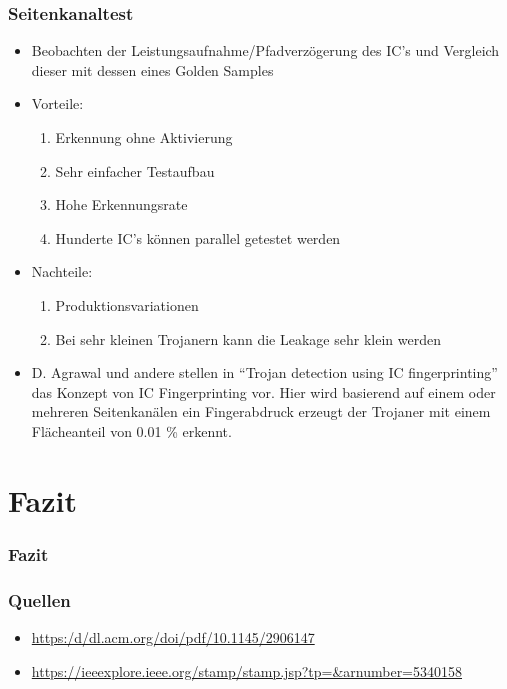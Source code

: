 \documentclass[11pt]{beamer}
\begin{document}
\begin{frame}
    \frametitle{Seitenkanaltest}
    \begin{itemize}
        \item Beobachten der Leistungsaufnahme/Pfadverzögerung des IC's und Vergleich dieser mit dessen eines Golden Samples
        \item Vorteile:
        \begin{enumerate}
            \item Erkennung ohne Aktivierung
            \item Sehr einfacher Testaufbau
            \item Hohe Erkennungsrate
            \item Hunderte IC's können parallel getestet werden
        \end{enumerate}
        \item Nachteile:
        \begin{enumerate}
            \item Produktionsvariationen
            \item Bei sehr kleinen Trojanern kann die Leakage sehr klein werden
        \end{enumerate}
        \item D. Agrawal und andere stellen in “Trojan detection using IC fingerprinting” das Konzept von IC Fingerprinting vor. Hier wird basierend auf einem oder mehreren Seitenkanälen ein Fingerabdruck erzeugt der Trojaner mit einem Flächeanteil von 0.01 \% erkennt.
    \end{itemize}
\end{frame}

\section{Fazit}
\begin{frame}
    \frametitle{Fazit}
\end{frame}

\begin{frame}
    \frametitle{Quellen}
    \begin{itemize}
    \item \url{https:/d/dl.acm.org/doi/pdf/10.1145/2906147}
    \item \url{https://ieeexplore.ieee.org/stamp/stamp.jsp?tp=&arnumber=5340158}
    \end{itemize}
\end{frame}
\end{document}
